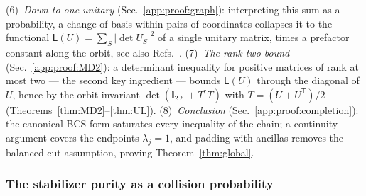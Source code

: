 \documentclass[prx,twocolumn,superscriptaddress,aps,10pt, frontmatterverbose, reprint,footinbib,longbibliography=true]{revtex4-2}
\newcommand{\trans}{\mathsf{T}}
\begin{document}
(6)~\emph{Down to one unitary} (Sec.~\ref{app:proof:graph}): interpreting this sum as a probability, a change of basis within pairs of coordinates collapses it to the functional $\mathsf{L}(U)=\sum_S|\det U_S|^2$ of a single unitary matrix, times a prefactor constant along the orbit, see also Refs.~\cite{collura2026nonstabilizernessfermionicgaussianstates,sfeo}.
(7)~\emph{The rank-two bound} (Sec.~\ref{app:proof:MD2}): a determinant inequality for positive matrices of rank at most two --- the second key ingredient --- bounds $\mathsf{L}(U)$ through the diagonal of $U$, hence by the orbit invariant $\det(\mathbb{I}_{2\ell}+T^\dagger T)$ with $T=(U+U^{\trans})/2$ (Theorems~\ref{thm:MD2}--\ref{thm:UL}).
(8)~\emph{Conclusion} (Sec.~\ref{app:proof:completion}): the canonical BCS form saturates every inequality of the chain; a continuity argument covers the endpoints $\lambda_j=1$, and padding with ancillas removes the balanced-cut assumption, proving Theorem~\ref{thm:global}.


\subsubsection{The stabilizer purity as a collision probability}
\label{app:proof:dpp}
\end{document}
